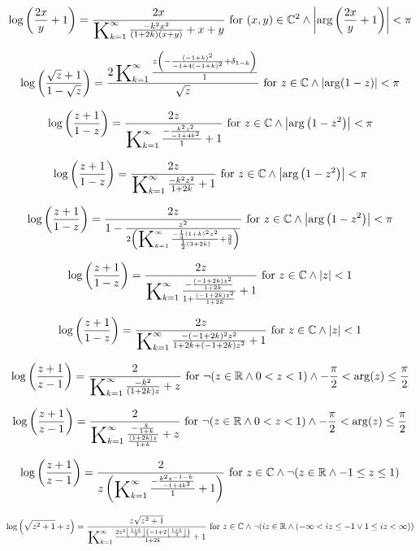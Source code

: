 \documentclass{article}
\newcommand{\bigK}{\mathop{\raisebox{-5pt}{\huge K}}}
\begin{document}
\[\log \left(\frac{2 x}{y}+1\right)=\frac{2 x}{\bigK_{k=1}^{\infty}\frac{-k^2 x^2}{(1+2 k) (x+y)}+x+y}\text{ for }(x,y)\in \mathbb{C}^2\land \left| \arg \left(\frac{2 x}{y}+1\right)\right| <\pi\] 

\[\log \left(\frac{\sqrt{z}+1}{1-\sqrt{z}}\right)=\frac{2 \bigK_{k=1}^{\infty}\frac{z \left(-\frac{(-1+k)^2}{-1+4 (-1+k)^2}+\delta _{1-k}\right)}{1}}{\sqrt{z}}\text{ for }z\in \mathbb{C}\land \left| \arg (1-z)\right| <\pi\] 

\[\log \left(\frac{z+1}{1-z}\right)=\frac{2 z}{\bigK_{k=1}^{\infty}\frac{-\frac{k^2 z^2}{-1+4 k^2}}{1}+1}\text{ for }z\in \mathbb{C}\land \left| \arg \left(1-z^2\right)\right| <\pi\] 

\[\log \left(\frac{z+1}{1-z}\right)=\frac{2 z}{\bigK_{k=1}^{\infty}\frac{-k^2 z^2}{1+2 k}+1}\text{ for }z\in \mathbb{C}\land \left| \arg \left(1-z^2\right)\right| <\pi\] 

\[\log \left(\frac{z+1}{1-z}\right)=\frac{2 z}{1-\frac{z^2}{2 \left(\bigK_{k=1}^{\infty}\frac{-\frac{1}{4} (1+k)^2 z^2}{\frac{1}{2} (3+2 k)}+\frac{3}{2}\right)}}\text{ for }z\in \mathbb{C}\land \left| \arg \left(1-z^2\right)\right| <\pi\] 

\[\log \left(\frac{z+1}{1-z}\right)=\frac{2 z}{\bigK_{k=1}^{\infty}\frac{-\frac{(-1+2 k) z^2}{1+2 k}}{1+\frac{(-1+2 k) z^2}{1+2 k}}+1}\text{ for }z\in \mathbb{C}\land \left| z\right| <1\] 

\[\log \left(\frac{z+1}{1-z}\right)=\frac{2 z}{\bigK_{k=1}^{\infty}\frac{-(-1+2 k)^2 z^2}{1+2 k+(-1+2 k) z^2}+1}\text{ for }z\in \mathbb{C}\land \left| z\right| <1\] 

\[\log \left(\frac{z+1}{z-1}\right)=\frac{2}{\bigK_{k=1}^{\infty}\frac{-k^2}{(1+2 k) z}+z}\text{ for }\neg (z\in \mathbb{R}\land 0<z<1)\land -\frac{\pi }{2}<\arg (z)\leq \frac{\pi }{2}\] 

\[\log \left(\frac{z+1}{z-1}\right)=\frac{2}{\bigK_{k=1}^{\infty}\frac{-\frac{k}{1+k}}{\frac{(1+2 k) z}{1+k}}+z}\text{ for }\neg (z\in \mathbb{R}\land 0<z<1)\land -\frac{\pi }{2}<\arg (z)\leq \frac{\pi }{2}\] 

\[\log \left(\frac{z+1}{z-1}\right)=\frac{2}{z \left(\bigK_{k=1}^{\infty}\frac{-\frac{k^2 z^{-1-k}}{-1+4 k^2}}{1}+1\right)}\text{ for }z\in \mathbb{C}\land \neg (z\in \mathbb{R}\land -1\leq z\leq 1)\] 

\[\log \left(\sqrt{z^2+1}+z\right)=\frac{z \sqrt{z^2+1}}{\bigK_{k=1}^{\infty}\frac{2 z^2 \left\lfloor \frac{1+k}{2}\right\rfloor  \left(-1+2 \left\lfloor \frac{1+k}{2}\right\rfloor \right)}{1+2 k}+1}\text{ for }z\in \mathbb{C}\land \neg (i z\in \mathbb{R}\land (-\infty <i z\leq -1\lor 1\leq i z<\infty ))\] 
\end{document}
